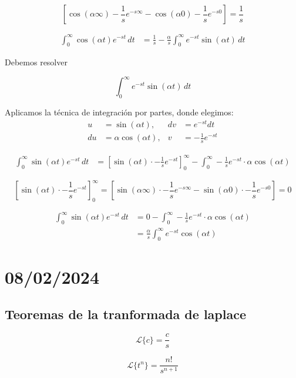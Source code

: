 \documentclass{article}
\begin{document}
\[\left[\cos(\alpha \infty) -\frac{1}{s}e^{-s\infty} - \cos(\alpha 0) -\frac{1}{s}e^{-s 0}\right] = \frac{1}{s}\]

\begin{align*}
    \int_{0}^{\infty} \cos(\alpha t) e^{-st} \, dt & = \frac{1}{s} - \frac{\alpha}{s} \int_{0}^{\infty} e^{-st}  \sin(\alpha t) \, dt
\end{align*}

Debemos resolver

\[ \int_{0}^{\infty} e^{-st} \sin(\alpha t) \, dt\]

Aplicamos la técnica de integración por partes, donde elegimos:
\begin{align*}
    u  & = \sin(\alpha t),        & dv & = e^{-st} dt           \\
    du & = \alpha \cos(\alpha t), & v  & =  -\frac{1}{s}e^{-st}
\end{align*}

\begin{align*}
    \int_{0}^{\infty} \sin(\alpha t) e^{-st} \, dt & = \left[ \sin(\alpha t) \cdot -\frac{1}{s}e^{-st}\right]_{0}^{\infty} - \int_{0}^{\infty} -\frac{1}{s}e^{-st} \cdot \alpha \cos(\alpha t)
\end{align*}

\[\left[ \sin(\alpha t) \cdot -\frac{1}{s}e^{-st}\right]_{0}^{\infty} = \left[\sin(\alpha \infty) \cdot -\frac{1}{s}e^{-s\infty} - \sin(\alpha 0) \cdot -\frac{1}{s}e^{-s0}\right] = 0\]

\begin{align*}
    \int_{0}^{\infty} \sin(\alpha t) e^{-st} \, dt & = 0 - \int_{0}^{\infty} -\frac{1}{s}e^{-st} \cdot \alpha \cos(\alpha t) \\
                                                   & = \frac{\alpha}{s} \int_{0}^{\infty} e^{-st} \cos(\alpha t)
\end{align*}

\section{08/02/2024}

\subsection{Teoremas de la tranformada de laplace}

\[
    \mathcal{L}\{c\} = \frac{c}{s}
\]

\[
    \mathcal{L}\{t^n\} = \frac{n!}{s^{n+1}}
\]
\end{document}
